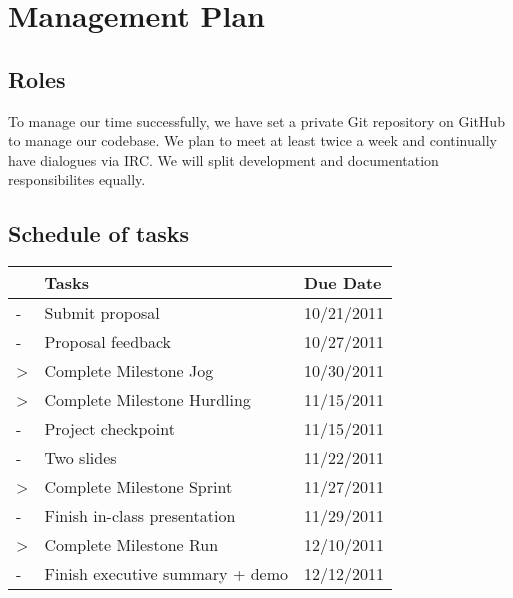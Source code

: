 \documentclass{article}
\begin{document}
\section{Management Plan}
\subsection{Roles}
To manage our time successfully, we have set a private Git repository on GitHub to manage our codebase. 
We plan to meet at least twice a week and continually have dialogues via IRC. We will split development
and documentation responsibilites equally.

\subsection{Schedule of tasks}
\begin{tabular}{|l|l|l|}
\hline
  & Tasks                             & Due Date   \\ \hline
- & Submit proposal                   & 10/21/2011 \\
- & Proposal feedback                 & 10/27/2011 \\
> & Complete Milestone Jog            & 10/30/2011 \\
> & Complete Milestone Hurdling       & 11/15/2011 \\
- & Project checkpoint                & 11/15/2011 \\
- & Two slides                        & 11/22/2011 \\
> & Complete Milestone Sprint         & 11/27/2011 \\
- & Finish in-class presentation      & 11/29/2011 \\
> & Complete Milestone Run            & 12/10/2011 \\
- & Finish executive summary + demo   & 12/12/2011 \\
\hline
\end{tabular}
\end{document}

